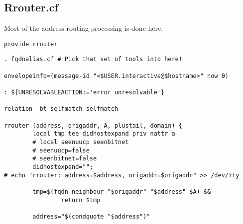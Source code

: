 \subsection{Rrouter.cf}



Most of the address routing processing is done here.



\begin{verbatim}
provide rrouter
\end{verbatim}


\begin{verbatim}
. fqdnalias.cf # Pick that set of tools into here!

envelopeinfo=(message-id "<$USER.interactive@$hostname>" now 0)

: ${UNRESOLVABLEACTION:='error unresolvable'}

relation -bt selfmatch selfmatch

rrouter (address, origaddr, A, plustail, domain) {
        local tmp tee didhostexpand priv nattr a
        # local seenuucp seenbitnet
        # seenuucp=false
        # seenbitnet=false
        didhostexpand="";
# echo "rrouter: address=$address, origaddr=$origaddr" >> /dev/tty

        tmp=$(fqdn_neighbour "$origaddr" "$address" $A) &&
                return $tmp

        address="$(condquote "$address")"
\end{verbatim}

